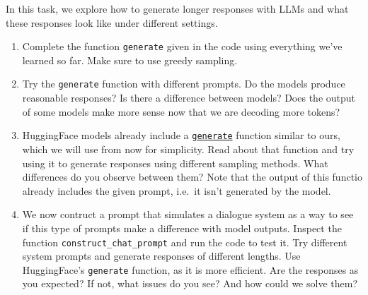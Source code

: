 \documentclass[11pt,a4paper]{article}
\begin{document}
In this task, we explore how to generate longer responses with LLMs and what
these responses look like under different settings.

\begin{enumerate}[label=(\alph*)]
    \item Complete the function \texttt{generate} given in the code using
          everything we've learned so far. Make sure to use greedy sampling.
    \item Try the \texttt{generate} function with different prompts. Do the
          models produce reasonable responses? Is there a difference between
          models? Does the output of some models make more sense now that we are
          decoding more tokens?
    \item HuggingFace models already include a
          \href{https://huggingface.co/docs/transformers/v4.51.3/en/main_classes/text_generation#transformers.GenerationMixin.generate}{\texttt{generate}}
          function similar to ours, which we will use from now for simplicity.
          Read about that function and try using it to generate responses using
          different sampling methods. What differences do you observe between
          them? Note that the output of this functio already includes the given 
          prompt, i.e.\ it isn't generated by the model.
    \item We now contruct a prompt that simulates a dialogue system as a way to
          see if this type of prompts make a difference with model outputs.
          Inspect the function \texttt{construct\_chat\_prompt} and run the code
          to test it. Try different system prompts and generate responses of 
          different lengths. Use HuggingFace's \texttt{generate} function, as it 
          is more efficient. Are the responses as you expected? If not, what 
          issues do you see? And how could we solve them? 
\end{enumerate}
\end{document}
